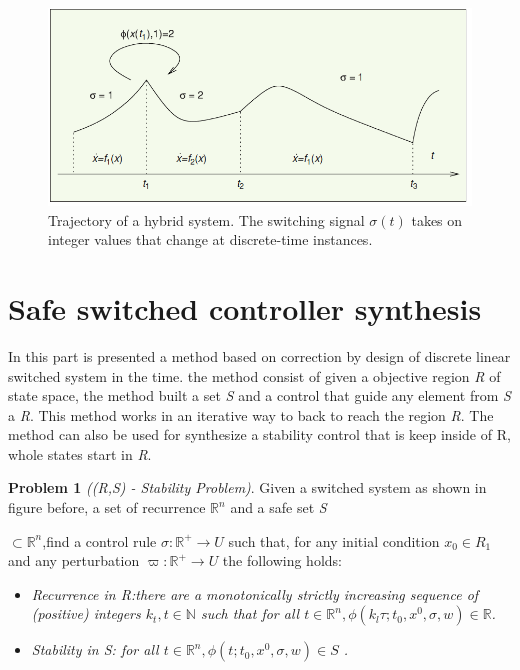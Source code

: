 \begin{figure}[!h]
    \begin{center}
        \includegraphics[width=\textwidth*4/5]{images/swiched}
        \caption{Trajectory of a hybrid system. The switching signal
        ${\sigma(t)}$ takes on integer values that change at 
        discrete-time instances.\citep{liberzon2003switching}}
    \end{center}
\end{figure}

\section{Safe switched controller synthesis}

In this part is presented a method based on correction by design of
 discrete linear switched system in the time. the method consist of 
 given a objective region \emph{R} of state space, the method built 
 a set \emph{S} and a control that guide any element from  \emph{S} 
 a \emph{R}. This method works in an iterative way to back to reach 
 the region \emph{R}. The method  can also be used for synthesize 
 a stability control that is keep inside of R, whole states start in
  \emph{R}. \cite{le2016distributed}

 \textbf{Problem 1} \emph{((R,S) - Stability Problem)}. Given a 
 switched system as shown in figure before, a set of recurrence 
 ${\mathbb{R}^n}$ and a safe set \emph{S}
 
 ${\subset \mathbb{R}^n}$,find a control rule 
 ${\sigma : \mathbb{R}^+ \rightarrow U}$ such that, for any
  initial condition ${x_0  \in  R_1}$ and any perturbation 
  ${\varpi :\mathbb{R}^+\rightarrow U}$  the
   following holds:
 
 \begin{itemize}
    \item \emph{ Recurrence in \emph{R}:there are a monotonically 
    strictly increasing sequence of (positive) integers
    ${k_t, t \in \mathbb{N}}$ such that for all ${ t \in \mathbb{R}^n,
    \phi(k_l\tau;t_0,x^0,\sigma,w) \in \mathbb{R} }$.}

    \item \emph{ Stability in \emph{S}: for all ${ t \in \mathbb{R}^n,
    \phi(t;t_0,x^0,\sigma,w) \in S}$ .}
\end{itemize}
 
